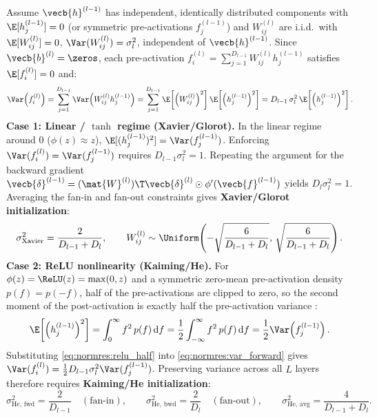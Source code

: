 \documentclass[../../../../master.tex]{subfiles}
\begin{document}
\begin{coremath}
\label{box:normres:init_proof}
Assume $\vecb{h}^{(l-1)}$ has independent, identically distributed components with $\E[h_j^{(l-1)}] = 0$ (or symmetric pre-activations $f_j^{(l-1)}$) and $W_{ij}^{(l)}$ are i.i.d.\ with $\E[W_{ij}^{(l)}] = 0$, $\Var(W_{ij}^{(l)}) = \sigma_l^2$, independent of $\vecb{h}^{(l-1)}$. Since $\vecb{b}^{(l)} = \zeros$, each pre-activation $f_i^{(l)} = \sum_{j=1}^{D_{l-1}} W_{ij}^{(l)} h_j^{(l-1)}$ satisfies $\E[f_i^{(l)}] = 0$ and:
\begin{equation}
  \Var\!\left(f_i^{(l)}\right) = \sum_{j=1}^{D_{l-1}} \Var\!\left(W_{ij}^{(l)} h_j^{(l-1)}\right)
  = \sum_{j=1}^{D_{l-1}} \E\!\left[\left(W_{ij}^{(l)}\right)^2\right] \E\!\left[\left(h_j^{(l-1)}\right)^2\right]
  = D_{l-1}\,\sigma_l^2\,\E\!\left[\left(h_j^{(l-1)}\right)^2\right].
  \label{eq:normres:var_forward}
\end{equation}
\textbf{Case 1: Linear / $\tanh$ regime (Xavier/Glorot).} In the linear regime around $0$ ($\phi(z) \approx z$), $\E[(h_j^{(l-1)})^2] = \Var(f_j^{(l-1)})$. Enforcing $\Var(f_i^{(l)}) = \Var(f_j^{(l-1)})$ requires $D_{l-1}\sigma_l^2 = 1$. Repeating the argument for the backward gradient $\vecb{\delta}^{(l-1)} = (\mat{W}^{(l)})\T \vecb{\delta}^{(l)} \odot \phi'(\vecb{f}^{(l-1)})$ yields $D_l \sigma_l^2 = 1$. Averaging the fan-in and fan-out constraints gives \textbf{Xavier/Glorot initialization}:
\begin{equation}
  \sigma_{\text{Xavier}}^2 = \frac{2}{D_{l-1} + D_l}, \qquad
  W_{ij}^{(l)} \sim \Uniform\!\left(-\sqrt{\frac{6}{D_{l-1}+D_l}},\, \sqrt{\frac{6}{D_{l-1}+D_l}}\right).
  \label{eq:normres:xavier}
\end{equation}
\textbf{Case 2: ReLU nonlinearity (Kaiming/He).} For $\phi(z) = \ReLU(z) = \max(0, z)$ and a symmetric zero-mean pre-activation density $p(f) = p(-f)$, half of the pre-activations are clipped to zero, so the second moment of the post-activation is exactly half the pre-activation variance :
\begin{equation}
  \E\!\left[\left(h_j^{(l-1)}\right)^2\right]
  = \int_0^{\infty} f^2\, p(f)\,\mathrm{d}f
  = \frac{1}{2}\int_{-\infty}^{\infty} f^2\, p(f)\,\mathrm{d}f
  = \frac{1}{2}\Var\!\left(f_j^{(l-1)}\right).
  \label{eq:normres:relu_half}
\end{equation}
Substituting \eqref{eq:normres:relu_half} into \eqref{eq:normres:var_forward} gives $\Var(f_i^{(l)}) = \frac{1}{2} D_{l-1} \sigma_l^2 \Var(f_j^{(l-1)})$. Preserving variance across all $L$ layers therefore requires \textbf{Kaiming/He initialization}:
\begin{equation}
  \sigma_{\text{He, fwd}}^2 = \frac{2}{D_{l-1}} \quad (\text{fan-in}), \qquad
  \sigma_{\text{He, bwd}}^2 = \frac{2}{D_l} \quad (\text{fan-out}), \qquad
  \sigma_{\text{He, avg}}^2 = \frac{4}{D_{l-1} + D_l}.
  \label{eq:normres:he_init}
\end{equation}
\end{coremath}
\end{document}
